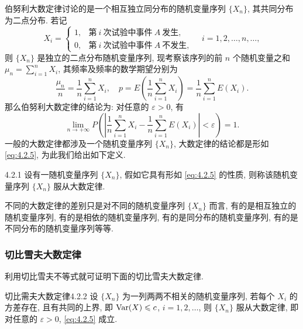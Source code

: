 伯努利大数定律讨论的是一个相互独立同分布的随机变量序列 $ \{ X_n \} $, 其共同分布为二点分布.
若记
\begin{equation*}
    X_i =
    \begin{cases}
        1, & \text{第} \ i \ \text{次试验中事件} \ A \ \text{发生},\\
        0, & \text{第} \ i \ \text{次试验中事件} \ A \ \text{不发生},
    \end{cases}
    \quad i=1,2,\dotsc,n,\dotsc,
\end{equation*}
则 $ \{ X_n \} $ 是独立的二点分布随机变量序列, 现考察该序列的前 $ n $ 个随机变量之和 $ \mu_n = \sum_{i=1}^n X_i $, 其频率及频率的数学期望分别为
\begin{equation*}
    \frac{\mu_n}{n} =  \frac{1}{n} \sum_{i=1}^n X_i, \quad p = E \left( \frac{1}{n} \sum_{i=1}^n X_i \right) = \frac{1}{n} \sum_{i=1}^n E (X_i).
\end{equation*}
那么伯努利大数定律的结论为: 对任意的 $ \varepsilon > 0 $, 有
\begin{equation}\label{eq:4.2.5}
    \lim_{n \to +\infty} P \left( \left\lvert \frac{1}{n} \sum_{i=1}^n X_i - \frac{1}{n} \sum_{i=1}^n E (X_i) \right\rvert < \varepsilon \right) = 1.
\end{equation}
一般的大数定律都涉及一个随机变量序列 $ \{ X_n \} $, 大数定律的结论都是形如 \eqref{eq:4.2.5}, 为此我们给出如下定义.

\begin{definition}{}{4.2.1}
    设有一随机变量序列 $ \{ X_n \} $, 假如它具有形如 \eqref{eq:4.2.5} 的性质, 则称该随机变量序列 $ \{ X_n \} $ 服从{\heiti 大数定律}.
\end{definition}

不同的大数定律的差别只是对不同的随机变量序列 $ \{ X_n \} $ 而言, 有的是相互独立的随机变量序列, 有的是相依的随机变量序列, 有的是同分布的随机变量序列, 有的是不同分布的随机变量序列等等.

\subsubsection{切比雪夫大数定律}

利用切比雪夫不等式就可证明下面的切比雪夫大数定律.

\begin{theorem}{切比需夫大数定律}{4.2.2}
    设 $ \{ X_n \} $ 为一列两两不相关的随机变量序列, 若每个 $ X_i $ 的方差存在, 且有共同的上界, 即 $\operatorname{Var}  (X) \leqslant c $, $ i=1,2, \dotsc $, 则 $ \{ X_n \} $ 服从大数定律, 即对任意的 $ \varepsilon > 0 $,  \eqref{eq:4.2.5}  成立.
\end{theorem}

